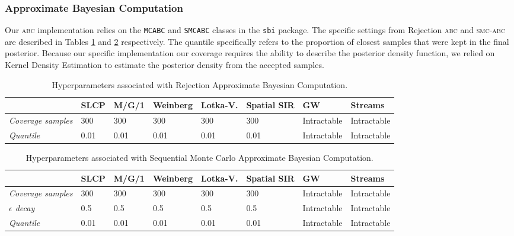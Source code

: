 \documentclass[twoside]{article}
\begin{document}
\subsubsection{Approximate Bayesian Computation}
Our \textsc{abc} implementation relies on the \texttt{MCABC} and \texttt{SMCABC} classes in the \texttt{sbi} \citep{sbi} package.
The specific settings from Rejection \textsc{abc} and \textsc{smc-abc} are described in Tables \ref{tab:abc_hyperparameters} and \ref{tab:smcabc_hyperparameters} respectively.
The quantile specifically refers to the proportion of closest samples that were kept in the final posterior. Because our specific implementation our coverage requires the ability to describe the posterior density function, we relied on Kernel Density Estimation to estimate the posterior density from the accepted samples.
\begin{table}[h!]
    \centering
    \begin{tabular}{llllllll}
        \toprule
        & SLCP & M/G/1 & Weinberg & Lotka-V. & Spatial SIR & GW & Streams \\
        \midrule
        \emph{Coverage samples} & 300 & 300 & 300 & 300 & 300 & Intractable & Intractable \\
        \emph{Quantile} & 0.01 & 0.01 & 0.01 & 0.01 & 0.01 & Intractable & Intractable \\
        \bottomrule
    \end{tabular}
    \caption{Hyperparameters associated with Rejection Approximate Bayesian Computation.}
    \label{tab:abc_hyperparameters}
\end{table}
\begin{table}[h!]
    \centering
    \begin{tabular}{llllllll}
        \toprule
        & SLCP & M/G/1 & Weinberg & Lotka-V. & Spatial SIR & GW & Streams \\
        \midrule
        \emph{Coverage samples} & 300 & 300 & 300 & 300 & 300 & Intractable & Intractable \\
        \emph{$\epsilon$ decay} & 0.5 & 0.5 & 0.5 & 0.5 & 0.5 & Intractable & Intractable \\
        \emph{Quantile} & 0.01 & 0.01 & 0.01 & 0.01 & 0.01 & Intractable & Intractable \\
        \bottomrule
    \end{tabular}
    \caption{Hyperparameters associated with Sequential Monte Carlo Approximate Bayesian Computation.}
    \label{tab:smcabc_hyperparameters}
\end{table}
\end{document}
